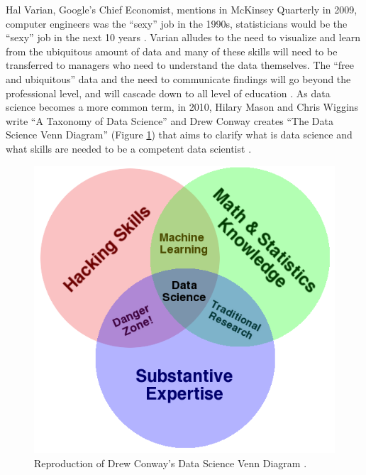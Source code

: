 \documentclass[010-intro.tex]{subfiles}
\begin{document}
    Hal Varian, Google's Chief Economist, mentions in McKinsey Quarterly in 2009,
    computer engineers was the ``sexy'' job in the 1990s,
    statisticians would be the ``sexy'' job in the next 10 years
    \cite{HalVarianHow2009}.
    Varian alludes to
    the need to visualize and learn from the ubiquitous amount of data and
    many of these skills will need to be transferred to managers who need to understand the data themselves.
    The ``free and ubiquitous'' data and the need to communicate findings will go beyond the professional level,
    and will cascade down to all level of education
    \cite{HalVarianHow2009}.
    As data science becomes a more common term,
    in 2010, Hilary Mason and Chris Wiggins write ``A Taxonomy of Data Science''
    \cite{masonTaxonomyDataScience2010}
    and
    Drew Conway creates ``The Data Science Venn Diagram'' (Figure \ref{fig:conway-venn})
    that aims to clarify what is data science and what skills are needed to be a competent data scientist
    \cite{conwayDataScienceVenn2010}.
    \begin{figure}[!hbtp]
        \centering
        \includegraphics[scale=0.5]{figs/050-intro/Data_Science_VD}
        \caption[Drew Conway's Data Science Venn Diagram]{
        Reproduction of Drew Conway's Data Science Venn Diagram \cite{conwayDataScienceVenn2010}.
        }
        \label{fig:conway-venn}
    \end{figure}
\end{document}
